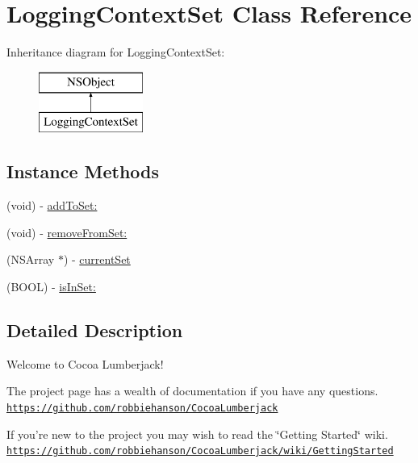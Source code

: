 \hypertarget{interface_logging_context_set}{\section{Logging\-Context\-Set Class Reference}
\label{interface_logging_context_set}
}
Inheritance diagram for Logging\-Context\-Set\-:\begin{figure}[H]
\begin{center}
\leavevmode
\includegraphics[height=2.000000cm]{interface_logging_context_set}
\end{center}
\end{figure}
\subsection*{Instance Methods}
\begin{DoxyCompactItemize}
\item 
(void) -\/ \hyperlink{interface_logging_context_set_aa1f75996ff50cf5a681577af66942247}{add\-To\-Set\-:}
\item 
(void) -\/ \hyperlink{interface_logging_context_set_aaf1369a14980f040863c4dd50195736c}{remove\-From\-Set\-:}
\item 
(N\-S\-Array $\ast$) -\/ \hyperlink{interface_logging_context_set_aecebdc603ef6998049375d279cc44c87}{current\-Set}
\item 
(B\-O\-O\-L) -\/ \hyperlink{interface_logging_context_set_a03cb64a8a7f765114db2b5164f93b0b1}{is\-In\-Set\-:}
\end{DoxyCompactItemize}


\subsection{Detailed Description}
Welcome to Cocoa Lumberjack!

The project page has a wealth of documentation if you have any questions. \href{https://github.com/robbiehanson/CocoaLumberjack}{\tt https\-://github.\-com/robbiehanson/\-Cocoa\-Lumberjack}

If you're new to the project you may wish to read the \char`\"{}\-Getting Started\char`\"{} wiki. \href{https://github.com/robbiehanson/CocoaLumberjack/wiki/GettingStarted}{\tt https\-://github.\-com/robbiehanson/\-Cocoa\-Lumberjack/wiki/\-Getting\-Started} 

